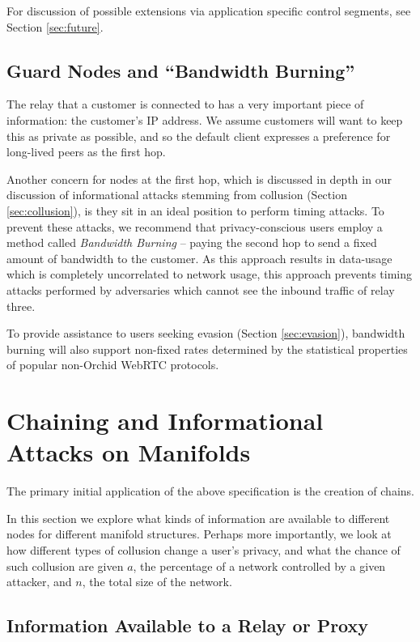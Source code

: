 \documentclass{article}
\begin{document}
For discussion of possible extensions via application specific control
segments, see Section \ref{sec:future}.

\subsection{Guard Nodes and ``Bandwidth Burning''}
\label{bandwidth-burning}

The relay that a customer is connected to has a very important piece
of information: the customer’s IP address. We assume customers will
want to keep this as private as possible, and so the default client
expresses a preference for long-lived peers as the first
hop.

Another concern for nodes at the first hop, which is discussed in
depth in our discussion of informational attacks stemming from
collusion (Section \ref{sec:collusion}), is they sit in an ideal
position to perform timing attacks. To prevent these attacks, we
recommend that privacy-conscious users employ a method called
\emph{Bandwidth Burning} -- paying the second hop to send a fixed
amount of bandwidth to the customer. As this approach results in
data-usage which is completely uncorrelated to network usage, this
approach prevents timing attacks performed by adversaries which cannot
see the inbound traffic of relay three.

To provide assistance to users seeking evasion (Section
\ref{sec:evasion}), bandwidth burning will also support non-fixed
rates determined by the statistical properties of popular non-Orchid
WebRTC protocols.

\section{Chaining and Informational Attacks on Manifolds}

The primary initial application of the above specification is the
creation of chains.

In this section we explore what kinds of information are available to different nodes for different manifold structures. Perhaps more importantly, we look at how different types of collusion change a user's privacy, and what the chance of such collusion are given $a$, the percentage of a network controlled by a given attacker, and $n$, the total size of the network.

\subsection{Information Available to a Relay or Proxy}
\label{relay-proxy-info-known}
\end{document}
